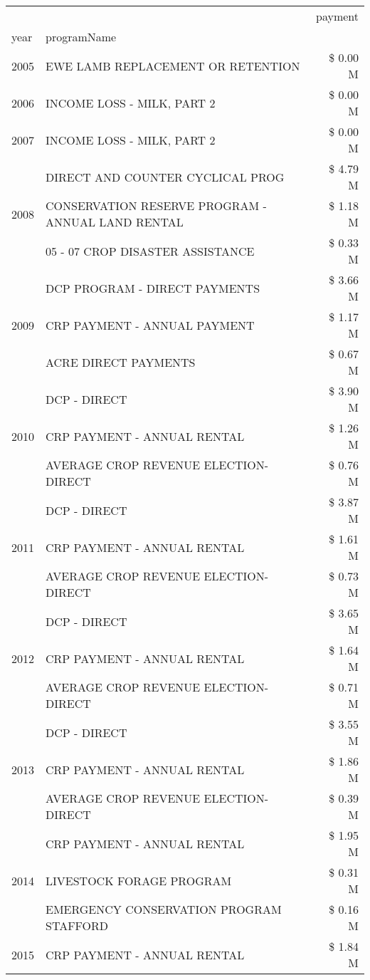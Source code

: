 \begin{tabular}{llr}
\toprule
 &  & payment \\
year & programName &  \\
\midrule
2005 & EWE LAMB REPLACEMENT OR RETENTION & \$ 0.00 M \\
\cline{1-3}
2006 & INCOME LOSS - MILK, PART 2 & \$ 0.00 M \\
\cline{1-3}
2007 & INCOME LOSS - MILK, PART 2 & \$ 0.00 M \\
\cline{1-3}
\multirow[t]{3}{*}{2008} & DIRECT AND COUNTER CYCLICAL PROG & \$ 4.79 M \\
 & CONSERVATION RESERVE PROGRAM - ANNUAL LAND RENTAL & \$ 1.18 M \\
 & 05 - 07 CROP DISASTER ASSISTANCE & \$ 0.33 M \\
\cline{1-3}
\multirow[t]{3}{*}{2009} & DCP PROGRAM - DIRECT PAYMENTS & \$ 3.66 M \\
 & CRP PAYMENT - ANNUAL PAYMENT & \$ 1.17 M \\
 & ACRE DIRECT PAYMENTS & \$ 0.67 M \\
\cline{1-3}
\multirow[t]{3}{*}{2010} & DCP - DIRECT & \$ 3.90 M \\
 & CRP PAYMENT - ANNUAL RENTAL & \$ 1.26 M \\
 & AVERAGE CROP REVENUE ELECTION-DIRECT & \$ 0.76 M \\
\cline{1-3}
\multirow[t]{3}{*}{2011} & DCP - DIRECT & \$ 3.87 M \\
 & CRP PAYMENT - ANNUAL RENTAL & \$ 1.61 M \\
 & AVERAGE CROP REVENUE ELECTION-DIRECT & \$ 0.73 M \\
\cline{1-3}
\multirow[t]{3}{*}{2012} & DCP - DIRECT & \$ 3.65 M \\
 & CRP PAYMENT - ANNUAL RENTAL & \$ 1.64 M \\
 & AVERAGE CROP REVENUE ELECTION-DIRECT & \$ 0.71 M \\
\cline{1-3}
\multirow[t]{3}{*}{2013} & DCP - DIRECT & \$ 3.55 M \\
 & CRP PAYMENT - ANNUAL RENTAL & \$ 1.86 M \\
 & AVERAGE CROP REVENUE ELECTION-DIRECT & \$ 0.39 M \\
\cline{1-3}
\multirow[t]{3}{*}{2014} & CRP PAYMENT - ANNUAL RENTAL & \$ 1.95 M \\
 & LIVESTOCK FORAGE PROGRAM & \$ 0.31 M \\
 & EMERGENCY CONSERVATION PROGRAM STAFFORD & \$ 0.16 M \\
\cline{1-3}
\multirow[t]{3}{*}{2015} & CRP PAYMENT - ANNUAL RENTAL & \$ 1.84 M \\

\end{tabular}
